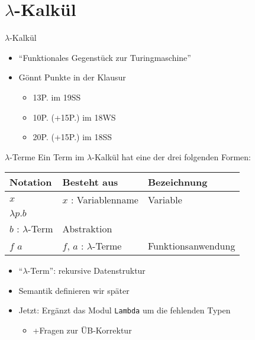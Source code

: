\documentclass{beamer}
\begin{document}
\section{$\lambda$-Kalkül}

\begin{frame}{$\lambda$-Kalkül}
	\begin{itemize}
                \item \enquote{Funktionales Gegenstück zur Turingmaschine}
		\item Gönnt Punkte in der Klausur
		\begin{itemize}
			\item 13P. im 19SS
			\item 10P. (+15P.) im 18WS
			\item 20P. (+15P.) im 18SS
		\end{itemize}
	\end{itemize}
\end{frame}

\begin{frame}{$\lambda$-Terme}
	Ein Term im $\lambda$-Kalkül hat eine der drei folgenden Formen:

	\vspace{0.5cm}

	\begin{tabularx}{\textwidth}{ X | X | X }
		\textbf{Notation} & \textbf{Besteht aus}                      & \textbf{Bezeichnung} \\
		\hline
		$x$               & $x$ : Variablenname                       & Variable             \\
		\hline
		$\lambda{}p.b$    &
			\begin{tabular}[t]{@{}c@{}}$p$ : Variablenname\\$b$ : $\lambda$-Term\end{tabular}
									      & Abstraktion          \\
		\hline
		$f$ $a$           & $f$, $a$ : $\lambda$-Terme                & Funktionsanwendung   \\
	\end{tabularx}

	\vspace{0.5cm}

	\begin{itemize}
		\item \enquote{$\lambda$-Term}: rekursive Datenstruktur
		\item Semantik definieren wir später
		\pause
		\item Jetzt: Ergänzt das Modul \texttt{Lambda} um die fehlenden Typen
		\begin{itemize}
			\item +Fragen zur ÜB-Korrektur
		\end{itemize}
	\end{itemize}
\end{frame}
\end{document}
